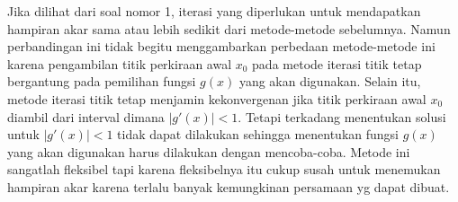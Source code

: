 \documentclass[12pt]{article}
\begin{document}
\begin{enumerate}
{\begin{enumerate}
{\begin{enumerate}
                \end{enumerate}
            }
        \end{enumerate}
        \qquad Jika dilihat dari soal nomor 1, iterasi yang diperlukan untuk mendapatkan hampiran akar sama atau lebih sedikit dari metode-metode sebelumnya. Namun perbandingan ini tidak begitu menggambarkan perbedaan metode-metode ini karena pengambilan titik perkiraan awal $ x_0 $ pada metode iterasi titik tetap bergantung pada pemilihan fungsi $ g(x) $ yang akan digunakan. Selain itu, metode iterasi titik tetap menjamin kekonvergenan jika titik perkiraan awal $ x_0 $ diambil dari interval dimana $ |g'(x)| < 1 $. Tetapi terkadang menentukan solusi untuk $ |g'(x)| < 1 $ tidak dapat dilakukan sehingga menentukan fungsi $ g(x) $ yang akan digunakan harus dilakukan dengan mencoba-coba. Metode ini sangatlah fleksibel tapi karena fleksibelnya itu cukup susah untuk menemukan hampiran akar karena terlalu banyak kemungkinan persamaan yg dapat dibuat. 
    }
\end{enumerate}
\end{document}
